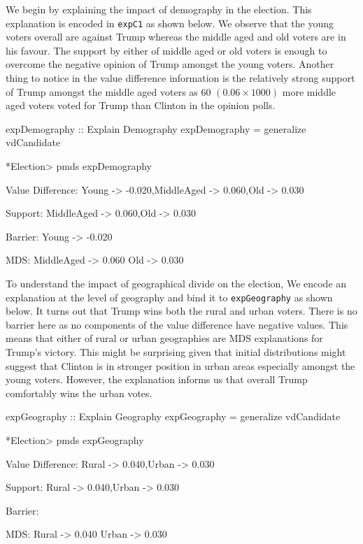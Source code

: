 \documentclass{jfp}
\newcommand{\prog}[1]{\texttt{#1}}
\begin{document}
We begin by explaining the impact of demography in the election. This explanation is encoded in \prog{expC1} as shown below. We observe that the young voters overall are against Trump whereas the middle aged and old voters are in his favour. The support by either of middle aged or old voters is enough to overcome the negative opinion of Trump amongst the young voters. Another thing to notice in the value difference information is the relatively strong support of Trump amongst the middle aged voters as 60 $(0.06 \times 1000 )$ more middle aged voters voted for Trump than Clinton in the opinion polls. 
\begin{haskellcode}
expDemography :: Explain Demography 
expDemography = generalize vdCandidate 

*Election> pmds expDemography

Value Difference: {Young -> -0.020,MiddleAged -> 0.060,Old -> 0.030}

Support: {MiddleAged -> 0.060,Old -> 0.030}

Barrier: {Young -> -0.020}

MDS: {MiddleAged -> 0.060}
     {Old -> 0.030}
\end{haskellcode}

To understand the impact of geographical divide on the election, We encode an explanation at the level of geography and bind it to \prog{expGeography} as shown below. It turns out that Trump wins both the rural and urban voters. There is no barrier here as no components of the value difference have negative values. This means that either of rural or urban geographies are MDS explanations for Trump's victory. This might be surprising given that initial distributions might suggest that Clinton is in stronger position in urban areas especially amongst the young voters. However, the explanation informs us that overall Trump comfortably wins the urban votes. 
\begin{haskellcode}
expGeography :: Explain Geography
expGeography = generalize vdCandidate 

*Election> pmds expGeography

Value Difference: {Rural -> 0.040,Urban -> 0.030}

Support: {Rural -> 0.040,Urban -> 0.030}

Barrier: {}

MDS: {Rural -> 0.040}
     {Urban -> 0.030}
\end{haskellcode}
\end{document}
